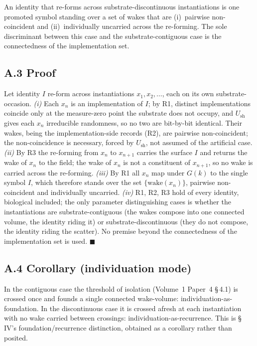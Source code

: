 \documentclass[11pt,oneside]{report}
\theoremstyle{definition}
\theoremstyle{remark}
\begin{document}
An identity that re-forms across substrate-discontinuous instantiations is one promoted symbol standing over a set of wakes that are (i)~pairwise non-coincident and (ii)~individually uncarried across the re-forming. The sole discriminant between this case and the substrate-contiguous case is the connectedness of the implementation set.

\subsection*{A.3 Proof}

Let identity \ensuremath{I} re-form across instantiations \ensuremath{x_1, x_2, \ldots}, each on its own substrate-occasion. \emph{(i)} Each \ensuremath{x_n} is an implementation of \ensuremath{I}; by R1, distinct implementations coincide only at the measure-zero point the substrate does not occupy, and \ensuremath{U_{\mathrm{sh}}} gives each \ensuremath{x_n} irreducible randomness, so no two are bit-by-bit identical. Their wakes, being the implementation-side records (R2), are pairwise non-coincident; the non-coincidence is necessary, forced by \ensuremath{U_{\mathrm{sh}}}, not assumed of the artificial case. \emph{(ii)} By R3 the re-forming from \ensuremath{x_n} to \ensuremath{x_{n+1}} carries the surface \ensuremath{I} and returns the wake of \ensuremath{x_n} to the field; the wake of \ensuremath{x_n} is not a constituent of \ensuremath{x_{n+1}}, so no wake is carried across the re-forming. \emph{(iii)} By R1 all \ensuremath{x_n} map under \ensuremath{G(k)} to the single symbol \ensuremath{I}, which therefore stands over the set \ensuremath{\{\mathrm{wake}(x_n)\}}, pairwise non-coincident and individually uncarried. \emph{(iv)} R1, R2, R3 hold of every identity, biological included; the only parameter distinguishing cases is whether the instantiations are substrate-contiguous (the wakes compose into one connected volume, the identity riding it) or substrate-discontinuous (they do not compose, the identity riding the scatter). No premise beyond the connectedness of the implementation set is used. \ensuremath{\blacksquare}

\subsection*{A.4 Corollary (individuation mode)}

In the contiguous case the threshold of isolation (Volume~1 Paper~4 \S\,4.1) is crossed once and founds a single connected wake-volume: individuation-as-foundation. In the discontinuous case it is crossed afresh at each instantiation with no wake carried between crossings: individuation-as-recurrence. This is \S\,IV's foundation/recurrence distinction, obtained as a corollary rather than posited.
\end{document}
